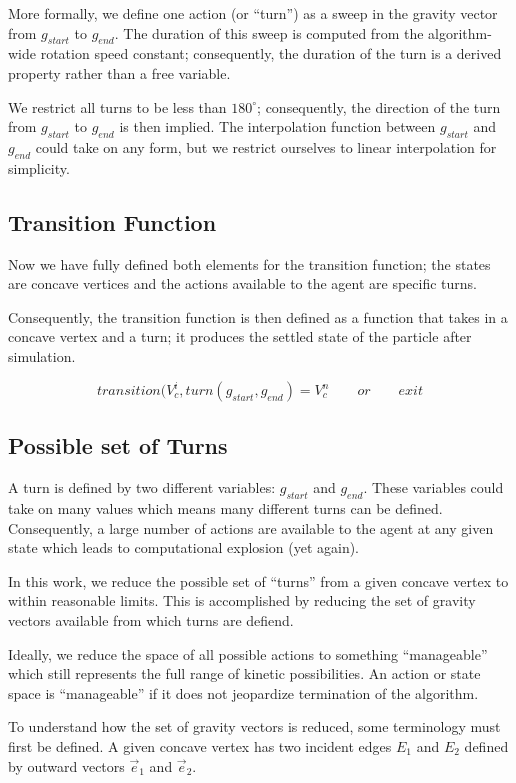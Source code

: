 More formally, we define one action (or ``turn'') as a sweep in the gravity vector from $g_{start}$ to $g_{end}$. The duration of this sweep is computed from the algorithm-wide rotation speed constant; consequently, the duration of the turn is a derived property rather than a free variable.

We restrict all turns to be less than $180^{\circ}$; consequently, the direction of the turn from $g_{start}$ to $g_{end}$ is then implied. The interpolation function between $g_{start}$ and $g_{end}$ could take on any form, but we restrict ourselves to linear interpolation for simplicity.

	\subsection{Transition Function}

Now we have fully defined both elements for the transition function; the states are concave vertices and the actions available to the agent are specific turns.

Consequently, the transition function is then defined as a function that takes in a concave vertex and a turn; it produces the settled state of the particle after simulation.

$$
transition(V_{c}^{i}, turn(g_{start}, g_{end}) = V_{c}^n \qquad or \qquad exit
$$

	\subsection{Possible set of Turns}

A turn is defined by two different variables: $g_{start}$ and $g_{end}$. These variables could take on many values which means many different turns can be defined. Consequently, a large number of actions are available to the agent at any given state which leads to computational explosion (yet again).

In this work, we reduce the possible set of ``turns'' from a given concave vertex to within reasonable limits. This is accomplished by reducing the set of gravity vectors available from which turns are defiend.

Ideally, we reduce the space of all possible actions to something ``manageable'' which still represents the full range of kinetic possibilities. An action or state space is ``manageable'' if it does not jeopardize termination of the algorithm.

To understand how the set of gravity vectors is reduced, some terminology must first be defined. A given concave vertex has two incident edges $E_1$ and $E_2$ defined by outward vectors $\vec{e}_1$ and $\vec{e}_2$.

